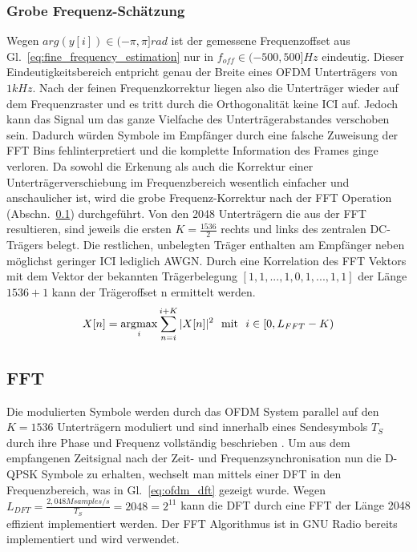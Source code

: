 \subsubsection{Grobe Frequenz-Schätzung}
Wegen $arg(y[i]) \in (-\pi,\pi] rad$ ist der gemessene Frequenzoffset aus Gl.~\ref{eq:fine_frequency_estimation} nur in $f_{off} \in (-500,500] Hz$ eindeutig. Dieser Eindeutigkeitsbereich entpricht genau der Breite eines OFDM Unterträgers von $1 kHz$. Nach der feinen Frequenzkorrektur liegen also die Unterträger wieder auf dem Frequenzraster und es tritt durch die Orthogonalität keine ICI auf. Jedoch kann das Signal um das ganze Vielfache des Unterträgerabstandes verschoben sein. Dadurch würden Symbole im Empfänger durch eine falsche Zuweisung der FFT Bins fehlinterpretiert und die komplette Information des Frames ginge verloren.
Da sowohl die Erkenung als auch die Korrektur einer Unterträgerverschiebung im Frequenzbereich wesentlich einfacher und anschaulicher ist, wird die grobe Frequenz-Korrektur nach der FFT Operation (Abschn.~\ref{sec:FFT}) durchgeführt.
Von den 2048 Unterträgern die aus der FFT resultieren, sind jeweils die ersten $K = \frac{1536}{2}$ rechts und links des zentralen DC-Trägers belegt. Die restlichen, unbelegten Träger enthalten am Empfänger neben möglichst geringer \ac{ICI} lediglich \ac{AWGN}. Durch eine Korrelation des FFT Vektors mit dem Vektor der bekannten Trägerbelegung $[1,1,...,1,0,1,...,1,1]$ der Länge $1536+1$ kann der Trägeroffset n ermittelt werden.
\begin{equation}
X[n] = \operatorname*{\arg\!\max}_i \sum \limits_{n=i}^{i+K} |X[n]|^2 \ \ \text{mit} \ \ i \in [0,L_{FFT}-K)
\end{equation}

\subsection{FFT}
\label{sec:FFT}
Die modulierten Symbole werden durch das OFDM System parallel auf den $K=1536$ Unterträgern moduliert und sind innerhalb eines Sendesymbols $T_S$ durch ihre Phase und Frequenz vollständig beschrieben \cite{nt1}. Um aus dem empfangenen Zeitsignal nach der Zeit- und Frequenzsynchronisation nun die D-QPSK Symbole zu erhalten, wechselt man mittels einer \ac{DFT} in den Frequenzbereich, was in Gl.~\ref{eq:ofdm_dft} gezeigt wurde. Wegen $L_{DFT} = \frac{2,048 M samples/s}{T_S} = 2048 = 2^{11}$ kann die \ac{DFT} durch eine \ac{FFT} der Länge 2048 effizient implementiert werden. Der \ac{FFT} Algorithmus ist in GNU Radio \cite{repo:gr-fft} bereits implementiert und wird verwendet.

